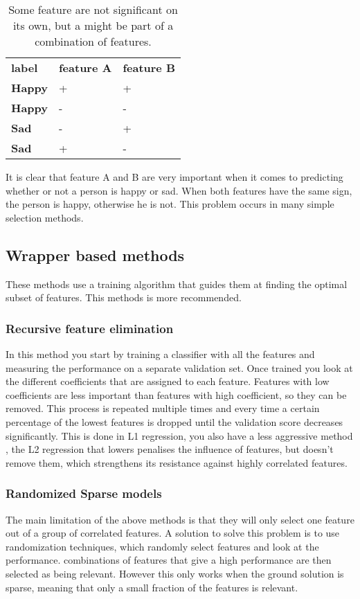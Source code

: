 \begin{table}[]
\centering
\label{featPair}
\begin{tabular}{lll}
\textbf{label} & \textbf{feature A} & \textbf{feature B} \\
\textbf{Happy} & +                  & +                  \\
\textbf{Happy} & -                  & -                  \\
\textbf{Sad}   & -                  & +                  \\
\textbf{Sad}   & +                  & -                 
\end{tabular}
\caption{Some feature are not significant on its own, but a might be part of a combination of features.}
\end{table}

It is clear that feature A and B are very important when it comes to predicting whether or not a person is happy or sad. When both features have the same sign, the person is happy, otherwise he is not. This problem occurs in many simple selection methods.

\subsection{Wrapper based methods}
These methods use a training algorithm that guides them at finding the optimal subset of features. This methods is more recommended.

\subsubsection{Recursive feature elimination}
In this method you start by training a classifier with all the features and measuring the performance on a separate validation set. Once trained you look at the different coefficients that are assigned to each feature. Features with low coefficients are less important than features with high coefficient, so they can be removed. This process is repeated multiple times and every time a certain percentage of the lowest features is dropped until the validation score decreases significantly. This is done in L1 regression, you also have a less aggressive method , the L2 regression that lowers penalises the influence of features, but doesn't remove them, which strengthens its resistance against highly correlated features. 

\subsubsection{Randomized Sparse models}
The main limitation of the above methods is that they will only select one feature out of a group of correlated features. A solution to solve this problem is to use randomization techniques, which randomly select features and look at the performance. combinations of features that give a high performance are then selected as being relevant. However this only works when the ground solution is sparse, meaning that only a small fraction of the features is relevant.

